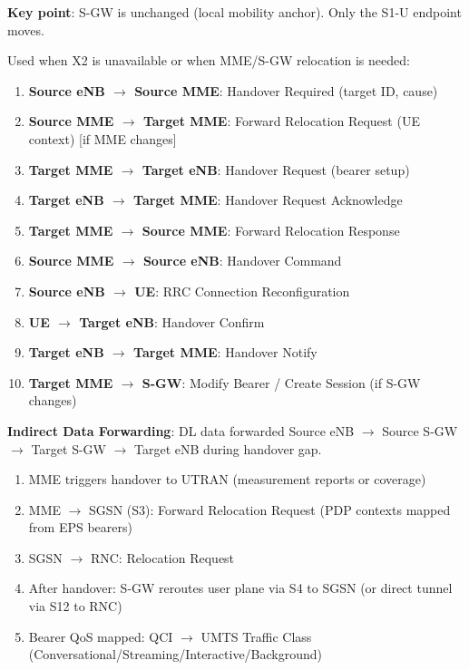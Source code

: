 \textbf{Key point}: S-GW is unchanged (local mobility anchor). Only the S1-U endpoint moves.


Used when X2 is unavailable or when MME/\allowbreak{}S-GW relocation is needed:

\begin{enumerate}
\def\labelenumi{\arabic{enumi}.}
\tightlist
\item
  \textbf{Source eNB \ensuremath{\to} Source MME}: Handover Required (target ID, cause)
\item
  \textbf{Source MME \ensuremath{\to} Target MME}: Forward Relocation Request (UE context) [if MME changes]
\item
  \textbf{Target MME \ensuremath{\to} Target eNB}: Handover Request (bearer setup)
\item
  \textbf{Target eNB \ensuremath{\to} Target MME}: Handover Request Acknowledge
\item
  \textbf{Target MME \ensuremath{\to} Source MME}: Forward Relocation Response
\item
  \textbf{Source MME \ensuremath{\to} Source eNB}: Handover Command
\item
  \textbf{Source eNB \ensuremath{\to} UE}: RRC Connection Reconfiguration
\item
  \textbf{UE \ensuremath{\to} Target eNB}: Handover Confirm
\item
  \textbf{Target eNB \ensuremath{\to} Target MME}: Handover Notify
\item
  \textbf{Target MME \ensuremath{\to} S-GW}: Modify Bearer /\allowbreak{} Create Session (if S-GW changes)
\end{enumerate}

\textbf{Indirect Data Forwarding}: DL data forwarded Source eNB \ensuremath{\to} Source S-GW \ensuremath{\to} Target S-GW \ensuremath{\to} Target eNB during handover gap.



\CNchained{}

\begin{enumerate}
\def\labelenumi{\arabic{enumi}.}
\tightlist
\item
  MME triggers handover to UTRAN (measurement reports or coverage)
\item
  MME \ensuremath{\to} SGSN (S3): Forward Relocation Request (PDP contexts mapped from EPS bearers)
\item
  SGSN \ensuremath{\to} RNC: Relocation Request
\item
  After handover: S-GW reroutes user plane via S4 to SGSN (or direct tunnel via S12 to RNC)
\item
  Bearer QoS mapped: QCI \ensuremath{\to} UMTS Traffic Class (Conversational/\allowbreak{}Streaming/\allowbreak{}Interactive/\allowbreak{}Background)
\end{enumerate}

